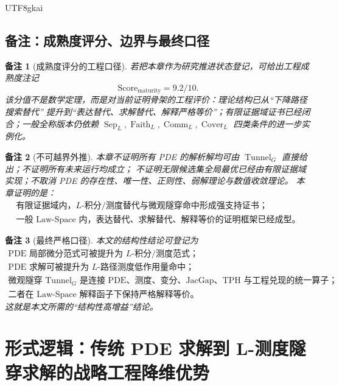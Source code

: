 \documentclass[12pt]{article}
\newtheorem{remark}{备注}[section]
\DeclareMathOperator{\Tunnel}{Tunnel}
\DeclareMathOperator{\Sep}{Sep}
\DeclareMathOperator{\Faith}{Faith}
\DeclareMathOperator{\Cover}{Cover}
\DeclareMathOperator{\Comm}{Comm}
\begin{document}
\begin{CJK*}{UTF8}{gkai}
\subsection{备注：成熟度评分、边界与最终口径}
\label{subsec:tex58-gain-maturity-remarks}

\begin{remark}[成熟度评分的工程口径]
若把本章作为研究推进状态登记，可给出工程成熟度注记
\[
  \mathrm{Score}_{\mathrm{maturity}}
  =
  9.2/10.
\]
该分值不是数学定理，而是对当前证明骨架的工程评价：理论结构已从“下降路径搜索替代”
提升到“表达替代、求解替代、解释严格等价”；有限证据域证书已经闭合；一般全称版本仍依赖
\(\Sep_L,\Faith_L,\Comm_L,\Cover_L\) 四类条件的进一步实例化。
\end{remark}

\begin{remark}[不可越界外推]
本章不证明所有 PDE 的解析解均可由 \(\Tunnel_G\) 直接给出；不证明所有未来运行均成立；
不证明无限候选集全局最优已经由有限证据域实现；不取消 PDE 的存在性、唯一性、正则性、弱解理论与数值收敛理论。
本章证明的是：
\[
  \boxed{
  \begin{gathered}
  \text{有限证据域内，}L\text{-积分/测度替代与微观隧穿命中形成强支持证书；}\\
  \text{一般 Law-Space 内，表达替代、求解替代、解释等价的证明框架已经成型。}
  \end{gathered}
  }
\]
\end{remark}

\begin{remark}[最终严格口径]
本文的结构性结论可登记为
\[
  \boxed{
  \begin{gathered}
  \text{PDE 局部微分范式可被提升为 }L\text{-积分/测度范式；}\\
  \text{PDE 求解可被提升为 }L\text{-路径测度低作用量命中；}\\
  \text{微观隧穿 } \Tunnel_G \text{ 是连接 PDE、测度、变分、JacGap、TPH 与工程兑现的统一算子；}\\
  \text{二者在 Law-Space 解释函子下保持严格解释等价。}
  \end{gathered}
  }
\]
这就是本文所需的“结构性高增益”结论。
\end{remark}

\clearpage

\section[形式逻辑：PDE 到 L-测度隧穿的战略降维]{形式逻辑：传统 PDE 求解到 L-测度隧穿求解的战略工程降维优势}
\label{sec:tex58-strategic-engineering-dimred}


\end{CJK*}
\end{document}
